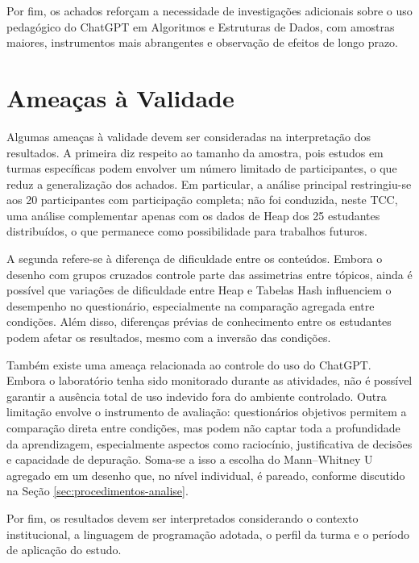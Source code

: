 Por fim, os achados reforçam a necessidade de investigações adicionais sobre o uso pedagógico do ChatGPT em Algoritmos e Estruturas de Dados, com amostras maiores, instrumentos mais abrangentes e observação de efeitos de longo prazo.

\section{Ameaças à Validade}
\label{sec:ameacas-validade}

Algumas ameaças à validade devem ser consideradas na interpretação dos resultados. A primeira diz respeito ao tamanho da amostra, pois estudos em turmas específicas podem envolver um número limitado de participantes, o que reduz a generalização dos achados. Em particular, a análise principal restringiu-se aos 20 participantes com participação completa; não foi conduzida, neste TCC, uma análise complementar apenas com os dados de Heap dos 25 estudantes distribuídos, o que permanece como possibilidade para trabalhos futuros.

A segunda refere-se à diferença de dificuldade entre os conteúdos. Embora o desenho com grupos cruzados controle parte das assimetrias entre tópicos, ainda é possível que variações de dificuldade entre Heap e Tabelas Hash influenciem o desempenho no questionário, especialmente na comparação agregada entre condições. Além disso, diferenças prévias de conhecimento entre os estudantes podem afetar os resultados, mesmo com a inversão das condições.

Também existe uma ameaça relacionada ao controle do uso do ChatGPT. Embora o laboratório tenha sido monitorado durante as atividades, não é possível garantir a ausência total de uso indevido fora do ambiente controlado. Outra limitação envolve o instrumento de avaliação: questionários objetivos permitem a comparação direta entre condições, mas podem não captar toda a profundidade da aprendizagem, especialmente aspectos como raciocínio, justificativa de decisões e capacidade de depuração. Soma-se a isso a escolha do Mann--Whitney U agregado em um desenho que, no nível individual, é pareado, conforme discutido na Seção \ref{sec:procedimentos-analise}.

Por fim, os resultados devem ser interpretados considerando o contexto institucional, a linguagem de programação adotada, o perfil da turma e o período de aplicação do estudo.

